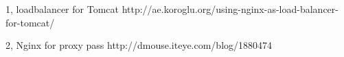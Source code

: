 1, loadbalancer for Tomcat
http://ae.koroglu.org/using-nginx-as-load-balancer-for-tomcat/

2, Nginx for proxy pass
http://dmouse.iteye.com/blog/1880474
